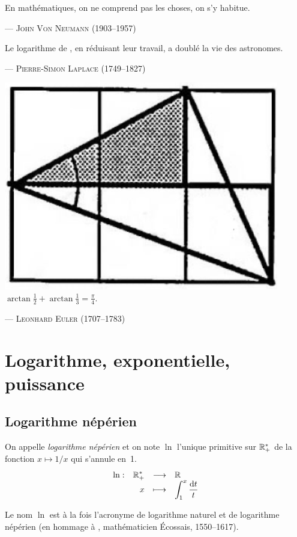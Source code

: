 \documentclass{magnoliaold}
\begin{document}
\setlength{}
\epigraph{\og En mathématiques, on ne comprend pas les choses, on s’y habitue.\fg}{--- \textsc{John Von Neumann (1903--1957)}}
\setlength{}
\epigraph{\og Le logarithme de , en réduisant leur travail, a doublé la vie des astronomes.\fg}{--- \textsc{Pierre-Simon Laplace (1749--1827)}}
\setlength{}
\epigraph{\includegraphics[width=0.9\textwidth]{../../Commun/Images/maths-cours-machin.png}\\
\og $\arctan\frac{1}{2}+\arctan\frac{1}{3}=\frac{\pi}{4}.$ \fg}{--- \textsc{Leonhard Euler (1707--1783)}}

\magtoc

\section{Logarithme, exponentielle, puissance}
\subsection{Logarithme népérien}
\begin{definition}[utile=-3]
On appelle \emph{logarithme népérien} et on note $\ln$ l'unique primitive sur $\mathbb{R}_+^*$ de la fonction $x\mapsto 1/x$ qui s'annule en~1.
\[\begin{array}[t]{lrcl} \displaystyle{\ln} : & \displaystyle{\mathbb{R}_+^*} & \longrightarrow & \displaystyle{\mathbb{R}} \\ & \displaystyle{x} & \longmapsto & \displaystyle{\int_{1}^{x} \frac{\text{d}t}{t}} \end{array}\]
\end{definition}

\begin{remarqueUnique}
\remarque Le nom $\ln$ est à la fois l'acronyme de logarithme naturel et de
  logarithme népérien (en hommage à , mathématicien Écossais,
  1550--1617).
\end{remarqueUnique}
\end{document}
